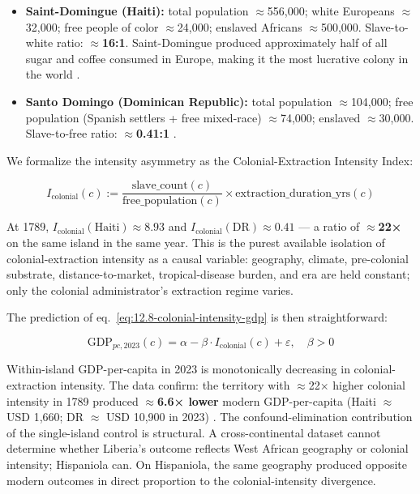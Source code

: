 \begin{itemize}
    \item \textbf{Saint-Domingue (Haiti):} total population $\approx$556,000; white Europeans $\approx$32,000; free people of color $\approx$24,000; enslaved Africans $\approx$500,000. Slave-to-white ratio: \textbf{$\approx$16:1}. Saint-Domingue produced approximately half of all sugar and coffee consumed in Europe, making it the most lucrative colony in the world \cite{geggus_haitian_revolution,james_black_jacobins}.
    \item \textbf{Santo Domingo (Dominican Republic):} total population $\approx$104,000; free population (Spanish settlers + free mixed-race) $\approx$74,000; enslaved $\approx$30,000. Slave-to-free ratio: \textbf{$\approx$0.41:1} \cite{moya_pons_dominican_republic}.
\end{itemize}

We formalize the intensity asymmetry as the Colonial-Extraction Intensity Index:

\begin{equation}\label{eq:12.7-colonial-intensity-index}
I_{\text{colonial}}(c) := \frac{\text{slave\_count}(c)}{\text{free\_population}(c)} \times \text{extraction\_duration\_yrs}(c)
\end{equation}

At 1789, $I_{\text{colonial}}(\text{Haiti}) \approx 8.93$ and $I_{\text{colonial}}(\text{DR}) \approx 0.41$ --- a ratio of \textbf{$\approx$22×} on the same island in the same year. This is the purest available isolation of colonial-extraction intensity as a causal variable: geography, climate, pre-colonial substrate, distance-to-market, tropical-disease burden, and era are held constant; only the colonial administrator's extraction regime varies.

The prediction of eq.~\ref{eq:12.8-colonial-intensity-gdp} is then straightforward:

\begin{equation}\label{eq:12.8-colonial-intensity-gdp}
\text{GDP}_{pc,2023}(c) = \alpha - \beta \cdot I_{\text{colonial}}(c) + \varepsilon, \quad \beta > 0
\end{equation}

Within-island GDP-per-capita in 2023 is monotonically decreasing in colonial-extraction intensity. The data confirm: the territory with $\approx$22× higher colonial intensity in 1789 produced \textbf{$\approx$6.6× lower} modern GDP-per-capita (Haiti $\approx$ USD 1,660; DR $\approx$ USD 10,900 in 2023) \cite{world_bank_wdi_2023}. The confound-elimination contribution of the single-island control is structural. A cross-continental dataset cannot determine whether Liberia's outcome reflects West African geography or colonial intensity; Hispaniola can. On Hispaniola, the same geography produced opposite modern outcomes in direct proportion to the colonial-intensity divergence.

